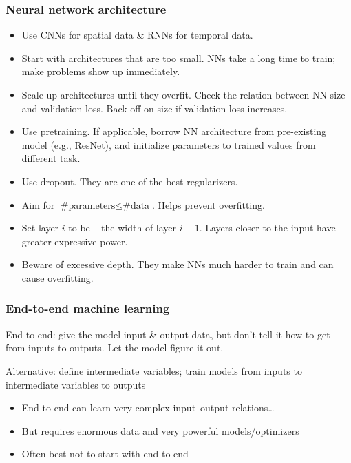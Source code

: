 \begin{frame}
    \frametitle{Neural network architecture}
    \begin{itemize}[<+->]
        \item \alert{Use CNNs for spatial data \& RNNs for temporal data.}
        \item \alert{Start with architectures that are too small.}
        NNs take a long time to train; make problems show up immediately.
        \item \alert{Scale up architectures until they overfit.}
        Check the relation between NN size and validation loss.
        Back off on size if validation loss increases.
        \item \alert{Use pretraining.}
        If applicable, borrow NN architecture from pre-existing model (e.g., ResNet), and initialize parameters to trained values from different task.
        \item \alert{Use dropout.}
        They are one of the best regularizers.
        \item \alert{Aim for $\text{\# parameters} \le \text{\# data}$.}
        Helps prevent overfitting.
        \item \alert{Set layer $i$ to be -- the width of layer $i - 1$.}
        Layers closer to the input have greater expressive power.
        \item \alert{Beware of excessive depth.}
        They make NNs much harder to train and can cause overfitting.
    \end{itemize}
\end{frame}

\begin{frame}
    \frametitle{End-to-end machine learning}

    \begin{block}{}
        \alert{End-to-end}: give the model input \& output data, but don't tell it how to get from inputs to outputs.
        Let the model figure it out.
    \end{block}

    \begin{center}
        
    \end{center}
    \pause

    \begin{block}{}
        Alternative: define intermediate variables; train models from inputs to intermediate variables to outputs
    \end{block}

    \begin{center}
        
    \end{center}
    \pause

    \begin{itemize}
        \item End-to-end can learn very complex input--output relations\ldots
        \item But requires enormous data and very powerful models/optimizers
        \item Often best not to start with end-to-end
    \end{itemize}
\end{frame}

